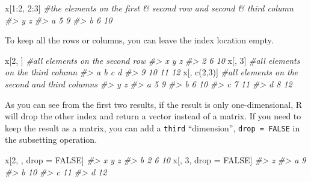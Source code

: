 \documentclass[
]{book}
\newenvironment{Shaded}{\begin{snugshade}}{\end{snugshade}}
\newcommand{\CommentTok}[1]{\textcolor[rgb]{0.56,0.35,0.01}{\textit{#1}}}
\newcommand{\ConstantTok}[1]{\textcolor[rgb]{0.00,0.00,0.00}{#1}}
\newcommand{\DecValTok}[1]{\textcolor[rgb]{0.00,0.00,0.81}{#1}}
\newcommand{\FunctionTok}[1]{\textcolor[rgb]{0.00,0.00,0.00}{#1}}
\newcommand{\NormalTok}[1]{#1}
\newcommand{\OtherTok}[1]{\textcolor[rgb]{0.56,0.35,0.01}{#1}}
\newcommand{\SpecialCharTok}[1]{\textcolor[rgb]{0.00,0.00,0.00}{#1}}
\begin{document}
\begin{Shaded}
\begin{Highlighting}[]
\NormalTok{x[}\DecValTok{1}\SpecialCharTok{:}\DecValTok{2}\NormalTok{, }\DecValTok{2}\SpecialCharTok{:}\DecValTok{3}\NormalTok{]   }\CommentTok{\#the elements on the first \& second row and second \& third column}
\CommentTok{\#\textgreater{}   y  z}
\CommentTok{\#\textgreater{} a 5  9}
\CommentTok{\#\textgreater{} b 6 10}
\end{Highlighting}
\end{Shaded}

To keep all the rows or columns, you can leave the index location empty.

\begin{Shaded}
\begin{Highlighting}[]
\NormalTok{x[}\DecValTok{2}\NormalTok{, ]       }\CommentTok{\#all elements on the second row}
\CommentTok{\#\textgreater{}  x  y  z }
\CommentTok{\#\textgreater{}  2  6 10}
\NormalTok{x[, }\DecValTok{3}\NormalTok{]       }\CommentTok{\#all elements on the third column}
\CommentTok{\#\textgreater{}  a  b  c  d }
\CommentTok{\#\textgreater{}  9 10 11 12}
\NormalTok{x[, }\FunctionTok{c}\NormalTok{(}\DecValTok{2}\NormalTok{,}\DecValTok{3}\NormalTok{)]  }\CommentTok{\#all elements on the second and third columns}
\CommentTok{\#\textgreater{}   y  z}
\CommentTok{\#\textgreater{} a 5  9}
\CommentTok{\#\textgreater{} b 6 10}
\CommentTok{\#\textgreater{} c 7 11}
\CommentTok{\#\textgreater{} d 8 12}
\end{Highlighting}
\end{Shaded}

As you can see from the first two results, if the result is only one-dimensional, R will drop the other index and return a vector instead of a matrix. If you need to keep the result as a matrix, you can add a \texttt{third} ``dimension'', \texttt{drop\ =\ FALSE} in the subsetting operation.

\begin{Shaded}
\begin{Highlighting}[]
\NormalTok{x[}\DecValTok{2}\NormalTok{, , drop }\OtherTok{=} \ConstantTok{FALSE}\NormalTok{]}
\CommentTok{\#\textgreater{}   x y  z}
\CommentTok{\#\textgreater{} b 2 6 10}
\NormalTok{x[, }\DecValTok{3}\NormalTok{, drop }\OtherTok{=} \ConstantTok{FALSE}\NormalTok{]}
\CommentTok{\#\textgreater{}    z}
\CommentTok{\#\textgreater{} a  9}
\CommentTok{\#\textgreater{} b 10}
\CommentTok{\#\textgreater{} c 11}
\CommentTok{\#\textgreater{} d 12}
\end{Highlighting}
\end{Shaded}
\end{document}
